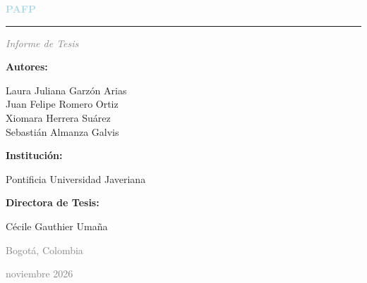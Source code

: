 \documentclass[12pt]{article}
\begin{document}
\vspace*{0.5cm}
\begin{center}
    \textcolor{lightblue}{\textbf{\fontsize{26}{31}\selectfont PAFP}}
\end{center}
\vspace{0.8cm}
\begin{center}
    \textcolor{lightblue}{\rule{6cm}{2pt}}
\end{center}
\vspace{1cm}
\begin{center}
    \textit{\fontsize{16}{19}\selectfont \textcolor{gray}{Informe de Tesis}}
\end{center}
\vspace{1cm}
\begin{center}
    \textbf{\fontsize{12}{14}\selectfont Autores:}
\end{center}
\begin{center}
    \fontsize{12}{14}\selectfont Laura Juliana Garzón Arias\\[2pt]
    \fontsize{12}{14}\selectfont Juan Felipe Romero Ortiz\\[2pt]
    \fontsize{12}{14}\selectfont Xiomara Herrera Suárez\\[2pt]
    \fontsize{12}{14}\selectfont Sebastián Almanza Galvis
\end{center}
\vspace{0.8cm}
\begin{center}
    \textbf{\fontsize{12}{14}\selectfont Institución:}
\end{center}
\begin{center}
    \fontsize{12}{14}\selectfont Pontificia Universidad Javeriana
\end{center}
\vspace{0.8cm}
\begin{center}
    \textbf{\fontsize{12}{14}\selectfont Directora de Tesis:}
\end{center}
\begin{center}
    \fontsize{12}{14}\selectfont Cécile Gauthier Umaña
\end{center}
\vspace{1.5cm}
\begin{center}
    \textcolor{gray}{\fontsize{12}{14}\selectfont Bogotá, Colombia}
\end{center}
\begin{center}
    \textcolor{gray}{\fontsize{12}{14}\selectfont noviembre 2026}
\end{center}

\newpage
\end{document}
